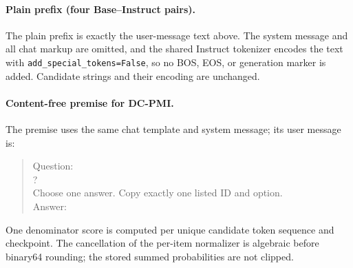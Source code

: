 \documentclass[11pt]{article}
\begin{document}
\paragraph{Plain prefix (four Base--Instruct pairs).}
The plain prefix is exactly the user-message text above. The system message
and all chat markup are omitted, and the shared Instruct tokenizer encodes the
text with \texttt{add\_special\_tokens=False}, so no BOS, EOS, or generation
marker is added. Candidate strings and their encoding are unchanged.

\paragraph{Content-free premise for DC-PMI.}
The premise uses the same chat template and system message; its user message
is:
\begin{quote}\small
Question:\\
?\\[.4ex]
Choose one answer. Copy exactly one listed ID and option.\\
Answer:
\end{quote}
One denominator score is computed per unique candidate token sequence and
checkpoint. The cancellation of the per-item normalizer is algebraic before
binary64 rounding; the stored summed probabilities are not clipped.
\end{document}
